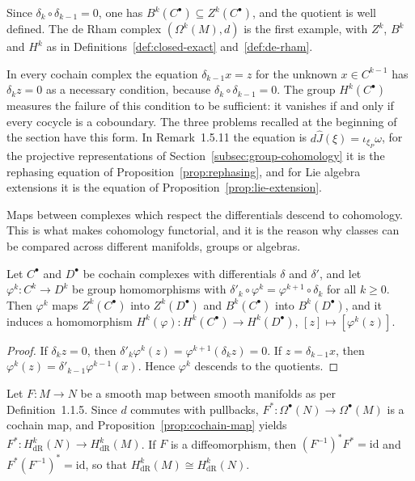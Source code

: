 Since $\delta_k\circ\delta_{k-1}=0$, one has $B^k(C^\bullet)\subseteq Z^k(C^\bullet)$, and the quotient is well defined. The de Rham complex $(\Omega^k(M),d)$ is the first example, with $Z^k$, $B^k$ and $H^k$ as in Definitions~\ref{def:closed-exact} and~\ref{def:de-rham}.

\begin{remark}\label{rem:obstruction}
	In every cochain complex the equation $\delta_{k-1}x=z$ for the unknown $x\in C^{k-1}$ has $\delta_kz=0$ as a necessary condition, because $\delta_k\circ\delta_{k-1}=0$. The group $H^k(C^\bullet)$ measures the failure of this condition to be sufficient: it vanishes if and only if every cocycle is a coboundary. The three problems recalled at the beginning of the section have this form. In Remark~1.5.11 the equation is $d\hat J(\xi)=\iota_{\xi_P}\omega$, for the projective representations of Section~\ref{subsec:group-cohomology} it is the rephasing equation of Proposition~\ref{prop:rephasing}, and for Lie algebra extensions it is the equation of Proposition~\ref{prop:lie-extension}.
\end{remark}

Maps between complexes which respect the differentials descend to cohomology. This is what makes cohomology functorial, and it is the reason why classes can be compared across different manifolds, groups or algebras.

\begin{proposition}\label{prop:cochain-map}
	Let $C^\bullet$ and $D^\bullet$ be cochain complexes with differentials $\delta$ and $\delta'$, and let $\varphi^k:C^k\to D^k$ be group homomorphisms with $\delta'_k\circ\varphi^k=\varphi^{k+1}\circ\delta_k$ for all $k\geq0$. Then $\varphi^k$ maps $Z^k(C^\bullet)$ into $Z^k(D^\bullet)$ and $B^k(C^\bullet)$ into $B^k(D^\bullet)$, and it induces a homomorphism $H^k(\varphi):H^k(C^\bullet)\to H^k(D^\bullet)$, $[z]\mapsto[\varphi^k(z)]$.
\end{proposition}

\begin{proof}
	If $\delta_kz=0$, then $\delta'_k\varphi^k(z)=\varphi^{k+1}(\delta_kz)=0$. If $z=\delta_{k-1}x$, then $\varphi^k(z)=\delta'_{k-1}\varphi^{k-1}(x)$. Hence $\varphi^k$ descends to the quotients.
\end{proof}

\begin{example}[Pullback]\label{ex:pullback}
	Let $F:M\to N$ be a smooth map between smooth manifolds as per Definition~1.1.5. Since $d$ commutes with pullbacks, $F^*:\Omega^\bullet(N)\to\Omega^\bullet(M)$ is a cochain map, and Proposition~\ref{prop:cochain-map} yields $F^*:H^k_{\mathrm{dR}}(N)\to H^k_{\mathrm{dR}}(M)$. If $F$ is a diffeomorphism, then $(F^{-1})^*F^*=\mathrm{id}$ and $F^*(F^{-1})^*=\mathrm{id}$, so that $H^k_{\mathrm{dR}}(M)\cong H^k_{\mathrm{dR}}(N)$.
\end{example}

